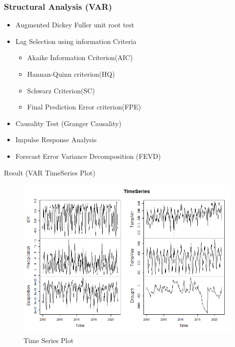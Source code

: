 \documentclass[11pt]{beamer}
\begin{document}
\begin{frame}
	\frametitle{Structural Analysis (VAR)}
			\begin{itemize}
				\item Augmented Dickey Fuller unit root test
				\item Lag Selection using information Criteria 
				   \begin{itemize}
				   \item	Akaike Information Criterion(AIC)
				   \item	Hannan-Quinn criterion(HQ)
				   \item Schwarz Criterion(SC)
				   \item Final Prediction Error criterion(FPE)
				   \end{itemize}
				\item Causality Test (Granger Causality)
				\item Impulse Response Analysis
				\item Forecast Error Variance Decomposition (FEVD)
			\end{itemize}
\end{frame}
\begin{frame}{Result  (VAR TimeSeries Plot)}
\begin{figure}
	\centering
	\includegraphics[width=0.7\linewidth]{images/TimeSeries}
	\caption{Time Series Plot}
	\label{fig:timeseries}
\end{figure}
\end{frame}
\end{document}
